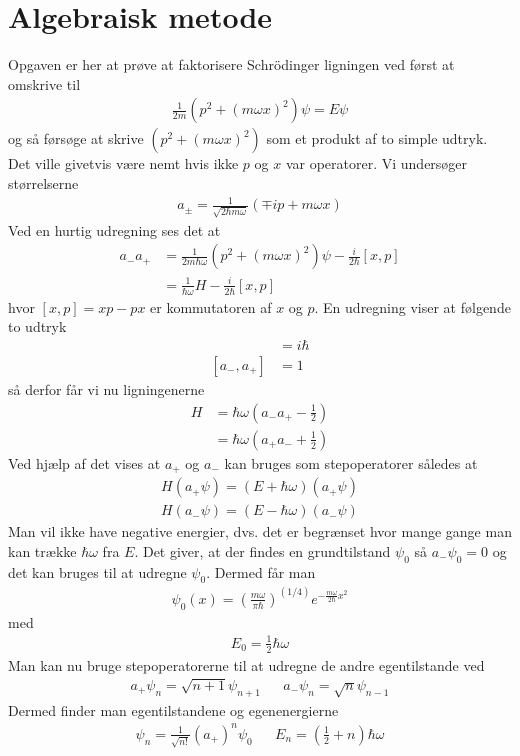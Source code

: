 \documentclass[danish,a4paper,oneside,onecolumn,article,11pt]{memoir}
\begin{document}
\section{Algebraisk metode}
Opgaven er her at prøve at faktorisere Schrödinger ligningen ved først
at omskrive til
\begin{align}
\frac{1}{2m} (p^2 + (m\omega x)^2)\psi = E\psi
\end{align}
og så førsøge at skrive $(p^2 + (m\omega x)^2)$ som et produkt af to
simple udtryk. Det ville givetvis være nemt hvis ikke $p$ og $x$ var
operatorer. Vi undersøger størrelserne
\begin{align}
a_{\pm} = \frac{1}{\sqrt{2\hbar m \omega}} (\mp i p + m\omega x)
\end{align}
Ved en hurtig udregning ses det at
\begin{align}
a_- a_+ &= \frac{1}{2m\hbar \omega} (p^2 + (m\omega x)^2)\psi 
  - \frac{i}{2\hbar}[x,p] \\
&= \frac{1}{\hbar \omega} H - \frac{i}{2\hbar}[x,p]
\end{align}
hvor $[x,p] = xp - px$ er kommutatoren af $x$ og $p$. En udregning
viser at følgende to udtryk
\begin{align}
[x,p] &= i\hbar \\
[a_- , a_+] &= 1
\end{align}
så derfor får vi nu ligningenerne
\begin{align}
H &= \hbar \omega \left(a_- a_+ - \frac{1}{2} \right) \\
 &= \hbar \omega \left(a_+ a_- + \frac{1}{2} \right)
\end{align}
Ved hjælp af det vises at $a_+$ og $a_-$ kan bruges som stepoperatorer
således at
\begin{align}
H(a_+ \psi) = (E + \hbar \omega) (a_+ \psi) \\
H(a_- \psi) = (E - \hbar \omega) (a_- \psi)
\end{align}
Man vil ikke have negative energier, dvs. det er begrænset hvor mange
gange man kan trække $\hbar \omega$ fra $E$. Det giver, at der findes
en grundtilstand $\psi_0$ så $a_- \psi_0 = 0$ og det kan bruges til at
udregne $\psi_0$. Dermed får man
\begin{align}
\psi_0(x) = \left( \frac{m \omega}{\pi \hbar} \right)^{(1/4)} 
  e^{- \frac{m \omega}{2 \hbar} x^2}
\end{align}
med
\begin{align}
E_0 = \frac{1}{2} \hbar \omega
\end{align}
Man kan nu bruge stepoperatorerne til at udregne de andre egentilstande ved
\begin{align}
a_+ \psi_n = \sqrt{n+1}\psi_{n+1} & & a_- \psi_n = \sqrt{n} \psi_{n-1}
\end{align}
Dermed finder man egentilstandene og egenenergierne
\begin{align}
\psi_n = \frac{1}{\sqrt{n!}} (a_+)^n \psi_0 & & E_n = \left( \frac{1}{2} + n \right) \hbar \omega
\end{align}
\end{document}
